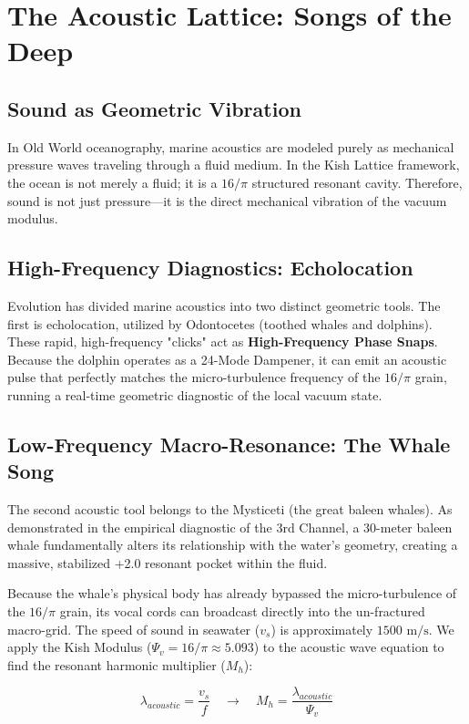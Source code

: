 \documentclass[11pt, letterpaper, openany]{book}
\begin{document}
\chapter{The Acoustic Lattice: Songs of the Deep}

\section{Sound as Geometric Vibration}
In Old World oceanography, marine acoustics are modeled purely as mechanical pressure waves traveling through a fluid medium. In the Kish Lattice framework, the ocean is not merely a fluid; it is a $16/\pi$ structured resonant cavity. Therefore, sound is not just pressure—it is the direct mechanical vibration of the vacuum modulus.

\section{High-Frequency Diagnostics: Echolocation}
Evolution has divided marine acoustics into two distinct geometric tools. The first is echolocation, utilized by Odontocetes (toothed whales and dolphins). These rapid, high-frequency "clicks" act as \textbf{High-Frequency Phase Snaps}. Because the dolphin operates as a 24-Mode Dampener, it can emit an acoustic pulse that perfectly matches the micro-turbulence frequency of the $16/\pi$ grain, running a real-time geometric diagnostic of the local vacuum state.

\section{Low-Frequency Macro-Resonance: The Whale Song}
The second acoustic tool belongs to the Mysticeti (the great baleen whales). As demonstrated in the empirical diagnostic of the 3rd Channel, a 30-meter baleen whale fundamentally alters its relationship with the water's geometry, creating a massive, stabilized +2.0 resonant pocket within the fluid.

Because the whale's physical body has already bypassed the micro-turbulence of the $16/\pi$ grain, its vocal cords can broadcast directly into the un-fractured macro-grid. The speed of sound in seawater ($v_s$) is approximately $1500 \text{ m/s}$. We apply the Kish Modulus ($\Psi_v = 16/\pi \approx 5.093$) to the acoustic wave equation to find the resonant harmonic multiplier ($M_h$):

\begin{equation}
\lambda_{acoustic} = \frac{v_s}{f} \quad \longrightarrow \quad M_h = \frac{\lambda_{acoustic}}{\Psi_v}
\end{equation}
\end{document}

